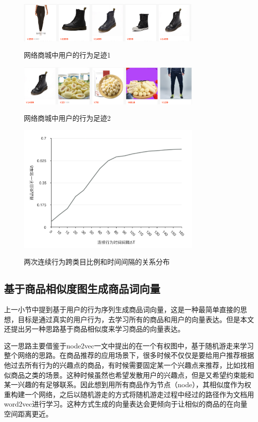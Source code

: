 \begin{figure}[!htp]
\centering
  \includegraphics[width=0.8\textwidth]{./graph/zuji1.png}\\
  \caption{网络商城中用户的行为足迹1}
\label{fig:zuji1}
\end{figure}
\begin{figure}[!htp]
\centering
  \includegraphics[width=0.8\textwidth]{./graph/zuji2.png}\\
  \caption{网络商城中用户的行为足迹2}
\label{fig:zuji2}
\end{figure}
\begin{figure}[!htp]
\centering
  \includegraphics[width=0.8\textwidth]{./graph/TimeDelta.png}\\
  \caption{两次连续行为跨类目比例和时间间隔的关系分布}
\label{fig:TimeDelta}
\end{figure}
\subsection{基于商品相似度图生成商品词向量}
上一小节中提到基于用户的行为序列生成商品词向量，这是一种最简单直接的思想，目标是通过真实的用户行为，去学习所有的商品和用户的向量表达。但是本文还提出另一种思路基于商品相似度来学习商品的向量表达。

这一思路主要借鉴于node2vec\cite{node2vec}一文中提出的在一个有权图中，基于随机游走来学习整个网络的思路。在商品推荐的应用场景下，很多时候不仅仅是要给用户推荐根据他过去所有行为的兴趣点的商品，有时候需要固定某一个兴趣点来推荐，比如找相似商品之类的场景。这种时候虽然也希望发散用户的兴趣点，但是又希望约束能和某一兴趣的有足够联系。因此想到用所有商品作为节点（node），其相似度作为权重构建一个网络，之后以随机游走的方式将随机游走过程中经过的路径作为文档用word2vec进行学习。这种方式生成的向量表达会更倾向于让相似的商品的在向量空间距离更近。

